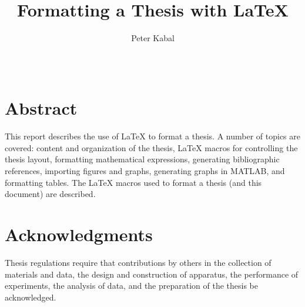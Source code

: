 \documentclass [12pt,letterpaper]{report}
\begin{document}

\title{Formatting a Thesis with \LaTeX}
\author{Peter Kabal}
\date{\Month\ \number\year}

\maketitle

\raggedbottom
\onehalfspacing
{}

\section*{\centering Abstract}

This report describes the use of \LaTeX{} to format a thesis.
A number of topics are covered: content and organization of the thesis,
 \LaTeX{} macros for controlling the thesis layout, formatting mathematical
 expressions, generating bibliographic references, importing figures and
 graphs, generating graphs in {\small MATLAB}, and formatting tables.
The \LaTeX{} macros used to format a thesis (and this document) are
 described.

\newpage

\section*{\centering Acknowledgments}

Thesis regulations require that contributions by others in the collection of
 materials and data, the design and construction of apparatus, the performance
 of experiments, the analysis of data, and the preparation of the thesis be
 acknowledged.

\tableofcontents
\listoffigures
\listoftables
\end{document}
